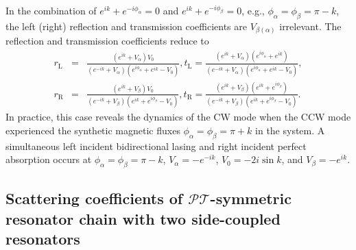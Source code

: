 \documentclass[prl,showpacs,superscriptaddress,twocolumn]{revtex4-1}
\begin{document}
\begin{widetext}
In the combination of $e^{ik}+e^{-i\phi _{\alpha }}=0$ and $e^{ik}+e^{-i\phi
_{\beta }}=0$, e.g., $\phi _{\alpha }=\phi _{\beta }=\pi -k$, the left
(right) reflection and transmission coefficients are $V_{\beta (\alpha )}$
irrelevant. The reflection and transmission coefficients reduce to
\begin{eqnarray}
r_{\mathrm{L}} &=&\frac{\left( e^{ik}+V_{\alpha }\right) V_{0}}{\left(
e^{-ik}+V_{\alpha }\right) \left( e^{i\phi _{\alpha }}+e^{ik}-V_{0}\right) }%
,t_{\mathrm{L}}=\frac{\left( e^{ik}+V_{\alpha }\right) \left( e^{i\phi
_{\alpha }}+e^{ik}\right) }{\left( e^{-ik}+V_{\alpha }\right) \left(
e^{i\phi _{\alpha }}+e^{ik}-V_{0}\right) }, \\
r_{\mathrm{R}} &=&\frac{\left( e^{ik}+V_{\beta }\right) V_{0}}{\left(
e^{-ik}+V_{\beta }\right) \left( e^{ik}+e^{i\phi _{\beta }}-V_{0}\right) }%
,t_{\mathrm{R}}=\frac{\left( e^{ik}+V_{\beta }\right) \left( e^{ik}+e^{i\phi
_{\beta }}\right) }{\left( e^{-ik}+V_{\beta }\right) \left( e^{ik}+e^{i\phi
_{\beta }}-V_{0}\right) }.
\end{eqnarray}%
In practice, this case reveals the dynamics of the CW mode when the CCW mode
experienced the synthetic magnetic fluxes $\phi _{\alpha }=\phi _{\beta
}=\pi +k$ in the system. A simultaneous left incident bidirectional lasing
and right incident perfect absorption occurs at $\phi _{\alpha }=\phi
_{\beta }=\pi -k$, $V_{\alpha }=-e^{-ik}$, $V_{0}=-2i\sin k$, and $V_{\beta
}=-e^{ik}$.

\subsection{Scattering coefficients of $\mathcal{PT}$-symmetric resonator
chain with two side-coupled resonators}


\end{widetext}
\end{document}
